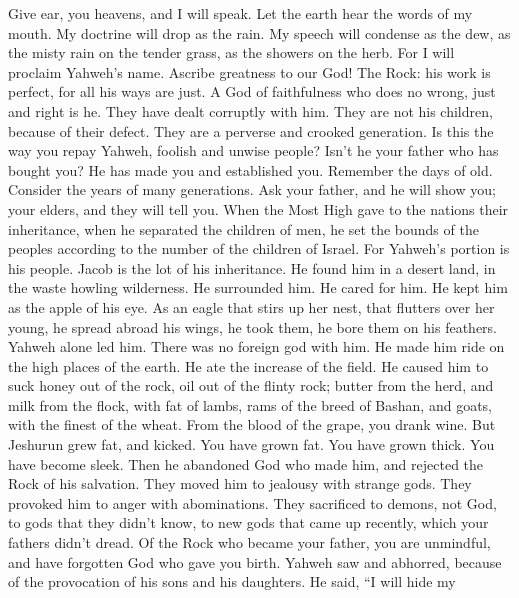  Give ear, you heavens, and I will speak. Let the earth
hear the words of my mouth.  My doctrine will drop as the
rain. My speech will condense as the dew, as the misty rain on the
tender grass, as the showers on the herb.  For I will
proclaim Yahweh's name. Ascribe greatness to our God!  The
Rock: his work is perfect, for all his ways are just. A God of
faithfulness who does no wrong, just and right is he. 
They have dealt corruptly with him. They are not his children, because
of their defect. They are a perverse and crooked generation.
 Is this the way you repay Yahweh, foolish and unwise
people? Isn't he your father who has bought you? He has made you and
established you.  Remember the days of old. Consider the
years of many generations. Ask your father, and he will show you; your
elders, and they will tell you.  When the Most High gave
to the nations their inheritance, when he separated the children of men,
he set the bounds of the peoples according to the number of the children
of Israel.  For Yahweh's portion is his people. Jacob is
the lot of his inheritance.  He found him in a desert
land, in the waste howling wilderness. He surrounded him. He cared for
him. He kept him as the apple of his eye.  As an eagle
that stirs up her nest, that flutters over her young, he spread abroad
his wings, he took them, he bore them on his feathers. 
Yahweh alone led him. There was no foreign god with him. 
He made him ride on the high places of the earth. He ate the increase of
the field. He caused him to suck honey out of the rock, oil out of the
flinty rock;  butter from the herd, and milk from the
flock, with fat of lambs, rams of the breed of Bashan, and goats, with
the finest of the wheat. From the blood of the grape, you drank wine.
 But Jeshurun grew fat, and kicked. You have grown fat.
You have grown thick. You have become sleek. Then he abandoned God who
made him, and rejected the Rock of his salvation.  They
moved him to jealousy with strange gods. They provoked him to anger with
abominations.  They sacrificed to demons, not God, to
gods that they didn't know, to new gods that came up recently, which
your fathers didn't dread.  Of the Rock who became your
father, you are unmindful, and have forgotten God who gave you birth.
 Yahweh saw and abhorred, because of the provocation of
his sons and his daughters.  He said, ``I will hide my
